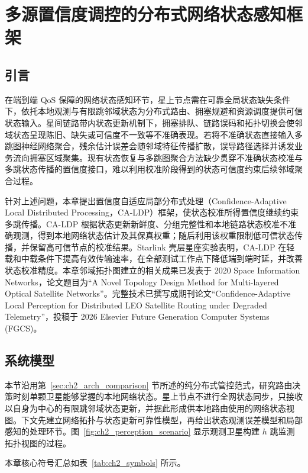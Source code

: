 \chapter{多源置信度调控的分布式网络状态感知框架}
\label{chap:perception}

\section{引言}

在端到端 QoS 保障的网络状态感知环节，星上节点需在可靠全局状态缺失条件下，依托本地观测与有限跳邻域状态为分布式路由、拥塞规避和资源调度提供可信状态输入。星间链路带内状态更新机制下，拥塞排队、链路误码和拓扑切换会使邻域状态呈现陈旧、缺失或可信度不一致等不准确表现。若将不准确状态直接输入多跳图神经网络聚合，残余估计误差会随邻域特征传播扩散，误导路径选择并诱发业务流向拥塞区域聚集。现有状态恢复与多跳图聚合方法缺少贯穿不准确状态校准与多跳状态传播的置信度接口，难以利用校准阶段得到的状态可信度约束后续邻域聚合过程。

针对上述问题，本章提出置信度自适应局部分布式处理（Confidence-Adaptive Local Distributed Processing，CA-LDP）框架，使状态校准所得置信度继续约束多跳传播。CA-LDP 根据状态更新新鲜度、分组完整性和本地链路状态校准不准确观测，得到本地网络状态估计及其保真权重；随后利用该权重限制低可信状态传播，并保留高可信节点的校准结果。Starlink 壳层星座实验表明，CA-LDP 在轻载和中载条件下提高有效传输速率，在全部测试工作点下降低端到端时延，并改善状态校准精度。本章邻域拓扑图建立的相关成果已发表于 2020 Space Information Networks，论文题目为``A Novel Topology Design Method for Multi-layered Optical Satellite Networks''\cite{lxp-topologydesign}。完整技术已撰写成期刊论文``Confidence-Adaptive Local Perception for Distributed LEO Satellite Routing under Degraded Telemetry''，投稿于 2026 Elsevier Future Generation Computer Systems (FGCS)。


\section{系统模型}
\label{sec:ch2_sysmodel}

本节沿用第~\ref{sec:ch2_arch_comparison} 节所述的纯分布式管控范式，研究路由决策时刻单颗卫星能够掌握的本地网络状态。星上节点不进行全网状态同步，只接收以自身为中心的有限跳邻域状态更新，并据此形成供本地路由使用的网络状态视图。下文先建立网络拓扑与状态更新可靠性模型，再给出状态观测误差模型和局部感知的处理环节。图~\ref{fig:ch2_perception_scenario} 显示观测卫星构建 $h$ 跳监测拓扑视图的过程。

本章核心符号汇总如表~\ref{tab:ch2_symbols} 所示。

